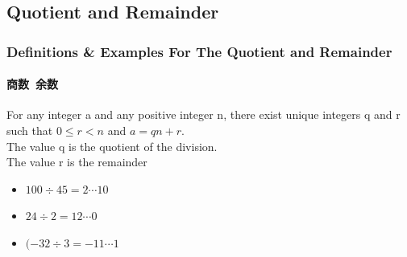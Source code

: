 \documentclass[
	11pt, %
]{beamer}
\begin{document}


\subsection{Quotient and Remainder}

\begin{frame}
	\frametitle{Definitions \& Examples For The Quotient and Remainder}
	\framesubtitle{商数\ 余数}
	
	\begin{definition}
	For any integer a and any \alert{positive} integer n, there exist unique integers q and r such that \alert{$0\leq r < n$} and $a = qn + r$. \\
	The value q is the quotient of the division. \\ The value r is the remainder
	\end{definition}
	
	\smallskip %
	
	\begin{example}
		\begin{itemize}
			\item $100 \div 45 = 2 \cdots 10 $
			\item $24 \div 2 = 12 \cdots 0 $ 
			\item $ (-32 \div 3 = -11 \cdots 1 $ 
		\end{itemize}
	\end{example}
\end{frame}

\end{document}
